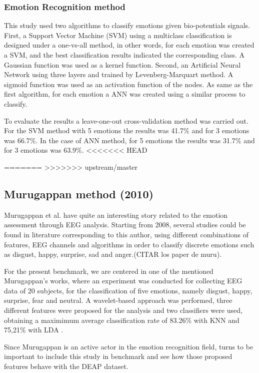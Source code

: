 \documentclass{sig-alternate}
\begin{document}
\subsubsection{Emotion Recognition method}

This study used two algorithms to classify emotions given bio-potentials signals.
First, a Support Vector Machine (SVM) using a multiclass classification is designed under 
a one-vs-all method, in other words, for each emotion was created a SVM, and the best
classification results indicated the corresponding class. A Gaussian function was used as a kernel function.
Second, an Artificial Neural Network using three layers and trained by Levenberg-Marquart method.
A sigmoid function was used as an activation function of the nodes. As same as the first algorithm,
for each emotion a ANN was created using a similar process to classify.

To evaluate the results a leave-one-out cross-validation method was carried out. 
For the SVM method with 5 emotions the results was 41.7\% and for 3 emotions was 66.7\%.
In the case of ANN method, for 5 emotions the results was 31.7\% and for 3 emotions was
63.9\%.   
<<<<<<< HEAD

=======
>>>>>>> upstream/master

\subsection{Murugappan method (2010)}	

Murugappan et al. have quite an interesting story related to the emotion assessment through EEG analysis. Starting from 2008, several studies could be found in literature corresponding to this author, using different combinations of features, EEG channels and algorithms in order to classify discrete emotions such as disgust, happy, surprise, sad and anger.(CITAR los paper de muru).

For the present benchmark, we are centered in one of the mentioned Murugappan's works, where an experiment was conducted for collecting EEG data of 20 subjects, for the classification of five emotions, namely disgust, happy, surprise, fear and neutral. A wavelet-based approach was performed, three different features were proposed for the analysis and two classifiers were used, obtaining a maximimum average classification rate of 83.26\% with KNN and 75,21\% with LDA \cite{Murugappan2010Classification}.

Since Murugappan is an active actor in the emotion recognition field, turns to be important to include this study in benchmark and see how those proposed features behave with the DEAP dataset.
\end{document}
